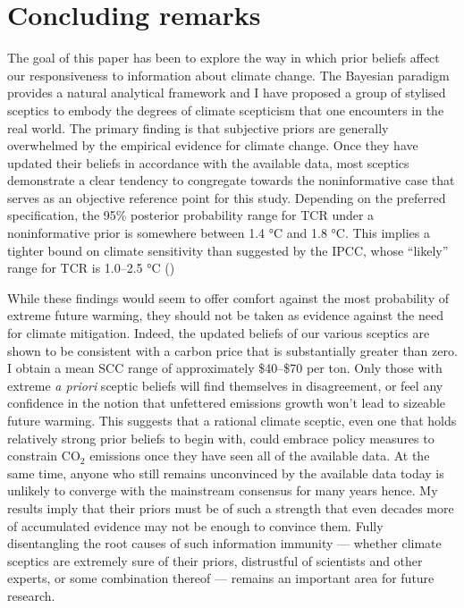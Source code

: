 \documentclass[smallextended]{svjour3}       %
\begin{document}
\hypertarget{sec:conclusion}{%
\section{Concluding remarks}\label{sec:conclusion}}

The goal of this paper has been to explore the way in which prior
beliefs affect our responsiveness to information about climate change.
The Bayesian paradigm provides a natural analytical framework and I have
proposed a group of stylised sceptics to embody the degrees of climate
scepticism that one encounters in the real world. The primary finding is
that subjective priors are generally overwhelmed by the empirical
evidence for climate change. Once they have updated their beliefs in
accordance with the available data, most sceptics demonstrate a clear
tendency to congregate towards the noninformative case that serves as an
objective reference point for this study. Depending on the preferred
specification, the 95\% posterior probability range for TCR under a
noninformative prior is somewhere between 1.4 °C and 1.8 °C. This
implies a tighter bound on climate sensitivity than suggested by the
IPCC, whose ``likely'' range for TCR is 1.0--2.5 °C (\cite{ipcc2013i})

While these findings would seem to offer comfort against the most
probability of extreme future warming, they should not be taken as
evidence against the need for climate mitigation. Indeed, the updated
beliefs of our various sceptics are shown to be consistent with a carbon
price that is substantially greater than zero. I obtain a mean SCC range
of approximately \$40--\$70 per ton. Only those with extreme \emph{a
priori} sceptic beliefs will find themselves in disagreement, or feel
any confidence in the notion that unfettered emissions growth won't lead
to sizeable future warming. This suggests that a rational climate
sceptic, even one that holds relatively strong prior beliefs to begin
with, could embrace policy measures to constrain CO\(_2\) emissions once
they have seen all of the available data. At the same time, anyone who
still remains unconvinced by the available data today is unlikely to
converge with the mainstream consensus for many years hence. My results
imply that their priors must be of such a strength that even decades
more of accumulated evidence may not be enough to convince them. Fully
disentangling the root causes of such information immunity --- whether
climate sceptics are extremely sure of their priors, distrustful of
scientists and other experts, or some combination thereof --- remains an
important area for future research.



\end{document}
